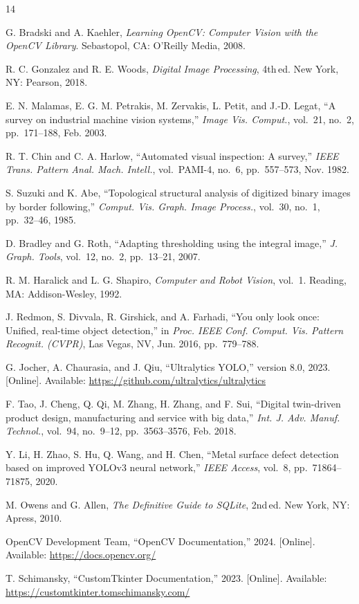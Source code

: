 \documentclass[12pt, a4paper]{article}
\begin{document}
\renewcommand{\refname}{}
\begin{thebibliography}{14}

G. Bradski and A. Kaehler, \textit{Learning OpenCV: Computer Vision with the OpenCV Library}.
Sebastopol, CA: O'Reilly Media, 2008.

R. C. Gonzalez and R. E. Woods, \textit{Digital Image Processing}, 4th\,ed.
New York, NY: Pearson, 2018.

E. N. Malamas, E. G. M. Petrakis, M. Zervakis, L. Petit, and J.-D. Legat,
``A survey on industrial machine vision systems,''
\textit{Image Vis. Comput.}, vol.~21, no.~2, pp.~171--188, Feb. 2003.

R. T. Chin and C. A. Harlow,
``Automated visual inspection: A survey,''
\textit{IEEE Trans. Pattern Anal. Mach. Intell.}, vol.~PAMI-4, no.~6,
pp.~557--573, Nov. 1982.

S. Suzuki and K. Abe,
``Topological structural analysis of digitized binary images by border following,''
\textit{Comput. Vis. Graph. Image Process.}, vol.~30, no.~1, pp.~32--46, 1985.

D. Bradley and G. Roth,
``Adapting thresholding using the integral image,''
\textit{J. Graph. Tools}, vol.~12, no.~2, pp.~13--21, 2007.

R. M. Haralick and L. G. Shapiro, \textit{Computer and Robot Vision}, vol.~1.
Reading, MA: Addison-Wesley, 1992.

J. Redmon, S. Divvala, R. Girshick, and A. Farhadi,
``You only look once: Unified, real-time object detection,''
in \textit{Proc. IEEE Conf. Comput. Vis. Pattern Recognit. (CVPR)},
Las Vegas, NV, Jun. 2016, pp.~779--788.

G. Jocher, A. Chaurasia, and J. Qiu,
``Ultralytics YOLO,'' version 8.0, 2023. [Online].
Available: \url{https://github.com/ultralytics/ultralytics}

F. Tao, J. Cheng, Q. Qi, M. Zhang, H. Zhang, and F. Sui,
``Digital twin-driven product design, manufacturing and service with big data,''
\textit{Int. J. Adv. Manuf. Technol.}, vol.~94, no.~9--12,
pp.~3563--3576, Feb. 2018.

Y. Li, H. Zhao, S. Hu, Q. Wang, and H. Chen,
``Metal surface defect detection based on improved YOLOv3 neural network,''
\textit{IEEE Access}, vol.~8, pp.~71864--71875, 2020.

M. Owens and G. Allen, \textit{The Definitive Guide to SQLite}, 2nd\,ed.
New York, NY: Apress, 2010.

OpenCV Development Team, ``OpenCV Documentation,'' 2024. [Online].
Available: \url{https://docs.opencv.org/}

T. Schimansky, ``CustomTkinter Documentation,'' 2023. [Online].
Available: \url{https://customtkinter.tomschimansky.com/}

\end{thebibliography}
\end{document}
